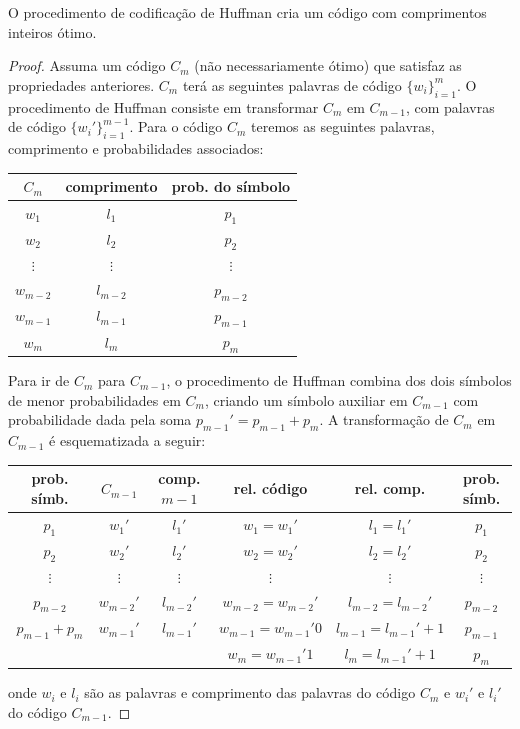 \begin{theorem}\label{thm:optcodhuffman}
O procedimento de codificação de Huffman cria um código com comprimentos inteiros ótimo.
\end{theorem}
\begin{proof}
  
Assuma um código $C_m$ (não necessariamente ótimo) que satisfaz as propriedades anteriores.
$C_m$ terá as seguintes palavras de código $\{w_i\}_{i=1}^m$.
O procedimento de Huffman consiste em transformar $C_m$ em $C_{m-1}$, com palavras de código $\{w_i'\}_{i=1}^{m-1}$.
Para o código $C_m$ teremos as seguintes palavras, comprimento e probabilidades associados:
\begin{center}
  \begin{tabular}{ccc}
  $C_m$ & comprimento & prob. do símbolo \\ \hline
  $w_1$ & $l_1$ & $p_1$ \\
  $w_2$ & $l_2$ & $p_2$ \\
  $\vdots$ & $\vdots$ & $\vdots$ \\
  $w_{m-2}$ & $l_{m-2}$ & $p_{m-2}$ \\
  $w_{m-1}$ & $l_{m-1}$ & $p_{m-1}$ \\
  $w_{m}$ & $l_{m}$ & $p_{m}$ \\
  \end{tabular}
\end{center}

Para ir de $C_m$ para $C_{m-1}$, o procedimento de Huffman combina dos dois símbolos
de menor probabilidades em $C_m$, criando um símbolo auxiliar em $C_{m-1}$ com probabilidade
dada pela soma $p_{m-1}' = p_{m-1} + p_m$. A transformação de $C_m$ em $C_{m-1}$ é
esquematizada a seguir:
\begin{center}
  \begin{tabular}{cccccc}
  \scriptsize{prob. símb.} & $C_{m-1}$ & \scriptsize{comp.} $m-1$ & \scriptsize{rel. código} & \scriptsize{rel. comp.} & \scriptsize{prob. símb.} \\ \hline
  $p_1$   & $w_1'$        & $l_1'$        & $w_1 = w_1'$  & $l_1 = l_1'$  & $p_1$ \\
  $p_2$   & $w_2'$        & $l_2'$        & $w_2 = w_2'$  & $l_2 = l_2'$  & $p_2$ \\
  $\vdots$ & $\vdots$ & $\vdots$ & $\vdots$ & $\vdots$ & $\vdots$ \\
  $p_{m-2}$   & $w_{m-2}'$        & $l_{m-2}'$        & $w_{m-2} = w_{m-2}'$  & $l_{m-2} = l_{m-2}'$  & $p_{m-2}$ \\
  $p_{m-1} + p_m$   & $w_{m-1}'$        & $l_{m-1}'$        & $w_{m-1} = w_{m-1}' 0$  & $l_{m-1} = l_{m-1}'+1$  & $p_{m-1}$ \\
          &       &       & $w_{m} = w_{m-1}' 1$ & $l_m = l_{m-1}'+1$ & $p_m$
  \end{tabular}
\end{center}
onde $w_i$ e $l_i$ são as palavras e comprimento das palavras do código $C_m$ e $w_i'$ e $l_i'$ do código $C_{m-1}$.


\end{proof}
